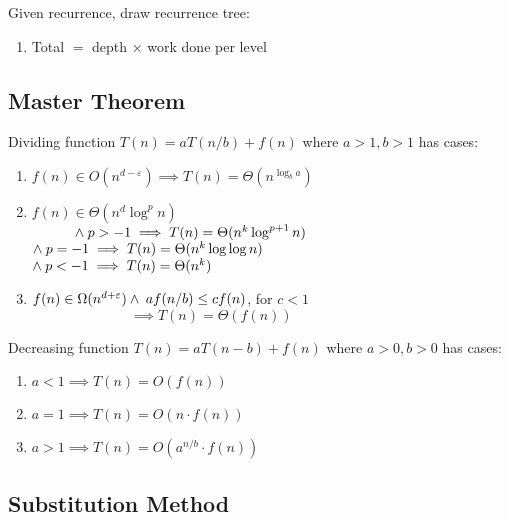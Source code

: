 \documentclass[12pt, a4paper]{article}
\begin{document}
\begin{multicols*}{3}
Given recurrence, draw recurrence tree:
\begin{enumerate}[\roman*.]
  \item Total $=$ depth $\times$ work done per level
\end{enumerate}


\colbreak

\subsection{Master Theorem}

Dividing function $T(n) = aT(n/b) + f(n)$ where $a>1, b>1$ has cases:
\begin{enumerate}[\roman*.]
  \item $f(n) \in O(n^{d-\varepsilon}) \implies T(n)=\Theta(n^{\log_ba})$
  \item $f(n) \in \Theta(n^d\log^p n)$ \\
    $\hspace{3em}\land\hspace{0.25em}p>-1 \implies T(n) = \Theta(n^k\log^{p+1}n)$\\
    \hspace{3em}$\land\hspace{0.25em}p=-1 \implies T(n) = \Theta(n^k\log\log n)$\\
    \hspace{3em}$\land\hspace{0.25em}p<-1 \implies T(n) = \Theta(n^k)$
  \item $f(n) \in \Omega(n^{d+\varepsilon}) \land\hspace{0.25em}af(n /b) \leq cf(n)$, for $c < 1$\\$\hspace{7em}\implies T(n)=\Theta(f(n))$
\end{enumerate}

Decreasing function $T(n) = aT(n-b) + f(n)$ where $a>0, b>0$ has cases:
\begin{enumerate}[\roman*.]
  \item $a < 1 \implies T(n)=O(f(n))$
  \item $a = 1 \implies T(n) = O(n\cdot f(n))$
  \item $a > 1 \implies T(n) = O(a^{n/b}\cdot f(n))$
\end{enumerate}



\subsection{Substitution Method}


\end{multicols*}
\end{document}
